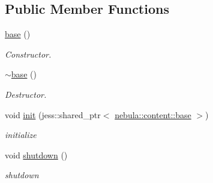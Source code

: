 \subsection*{Public Member Functions}
\begin{DoxyCompactItemize}
\item 
\hyperlink{classnebula_1_1content_1_1physics_1_1physx_1_1base_a3defb4af19d49479c2819e84e299871b}{base} ()
\begin{DoxyCompactList}\small\item\em Constructor. \item\end{DoxyCompactList}\item 
\hyperlink{classnebula_1_1content_1_1physics_1_1physx_1_1base_a2f146552e5178c6b616caededeca24c4}{$\sim$base} ()
\begin{DoxyCompactList}\small\item\em Destructor. \item\end{DoxyCompactList}\item 
void \hyperlink{classnebula_1_1content_1_1physics_1_1physx_1_1base_a18c8861b65e5812832ed38e5347a892f}{init} (jess::shared\_\-ptr$<$ \hyperlink{classnebula_1_1content_1_1base}{nebula::content::base} $>$)
\begin{DoxyCompactList}\small\item\em initialize \item\end{DoxyCompactList}\item 
void \hyperlink{classnebula_1_1content_1_1physics_1_1physx_1_1base_a4419704349a8cc19aa1c633d8694d598}{shutdown} ()
\begin{DoxyCompactList}\small\item\em shutdown \item\end{DoxyCompactList}\end{DoxyCompactItemize}
